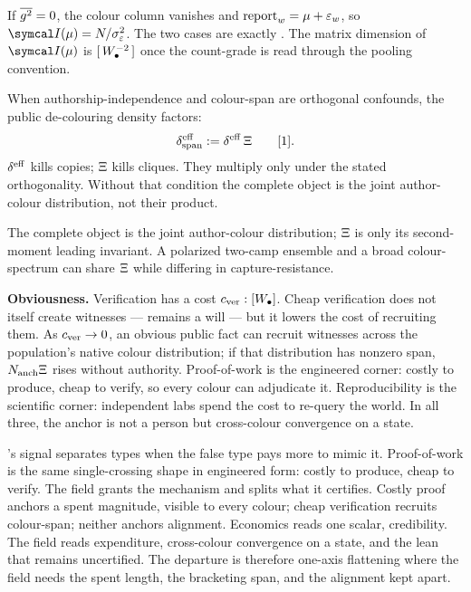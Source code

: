 \documentclass[../main]{subfiles}
\begin{document}
If $\overline{g\sp{2}}=0$, the colour column vanishes and
$\operatorname{report}\sb{w}=\mu+\varepsilon\sb{w}$, so
$\precisionof{\recoveryfact}=\countof/\spannoisevariance$. The two cases are exactly
. The matrix dimension of $\precisionof{\recoveryfact}$ is
$[\,W\sb{\bullet}\sp{-2}\,]$ once the count-grade is read through the pooling convention.

\begin{corollary}
  When authorship-independence and colour-span are orthogonal confounds, the public
  de-colouring density factors:
  \begin{equation}
    \spandensity:=\effdensity\,\colourspan\qquad \dimratio.
    \label{eq:pr:deltaspan}
  \end{equation}
  $\effdensity$ kills copies; $\Xi$ kills cliques. They multiply only under the
  stated orthogonality. Without that condition the complete object is the joint
  author-colour distribution, not their product.
\end{corollary}

The complete object is the joint author-colour distribution; $\Xi$ is only its
second-moment leading invariant. A polarized two-camp ensemble and a broad colour-spectrum
can share $\Xi$ while differing in capture-resistance.

\medskip
\noindent\textbf{Obviousness.}
Verification has a cost $c\sb{\mathrm{ver}}:[W\sb{\bullet}]$. Cheap verification does not itself
create witnesses ---  remains a will --- but it lowers the cost of recruiting
them. As $c\sb{\mathrm{ver}}\to0$, an obvious public fact can recruit witnesses across the
population's native colour distribution; if that distribution has nonzero span,
$N\sb{\mathrm{anch}}\Xi$ rises without authority. Proof-of-work is the engineered corner:
costly to produce, cheap to verify, so every colour can adjudicate it. Reproducibility is
the scientific corner: independent labs spend the cost to re-query the world. In all three,
the anchor is not a person but cross-colour convergence on a state.

\begin{econ}[label=e:pow, title={Costly proof splits credibility},
  ref=pr:span, cites={a:signaling}, departs=flatten,
  stopsat={one scalar credibility where the field splits burned stake, colour-span, and alignment}]
  \textcite{a:signaling}'s signal separates types when the false type pays more to mimic it.
  Proof-of-work is the same single-crossing shape in engineered form: costly to produce,
  cheap to verify. The field grants the mechanism and splits what it certifies. Costly proof
  anchors a spent magnitude, visible to every colour; cheap verification recruits
  colour-span; neither anchors alignment. Economics reads one scalar, credibility. The field
  reads expenditure, cross-colour convergence on a state, and the lean that remains
  uncertified. The departure is therefore one-axis flattening where the field needs the
  spent length, the bracketing span, and the alignment kept apart.
\end{econ}
\end{document}
